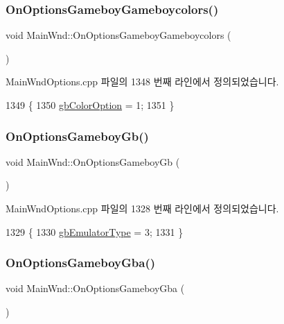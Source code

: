 \subsubsection{\texorpdfstring{On\+Options\+Gameboy\+Gameboycolors()}{OnOptionsGameboyGameboycolors()}}
{\footnotesize\ttfamily void Main\+Wnd\+::\+On\+Options\+Gameboy\+Gameboycolors (\begin{DoxyParamCaption}{ }\end{DoxyParamCaption})\hspace{0.3cm}{\ttfamily [protected]}}



Main\+Wnd\+Options.\+cpp 파일의 1348 번째 라인에서 정의되었습니다.


\begin{DoxyCode}
1349 \{
1350   \mbox{\hyperlink{gb_globals_8cpp_abb08650d8f653865820da10dc8e59a8b}{gbColorOption}} = 1;  
1351 \}
\end{DoxyCode}
\mbox{\label{class_main_wnd_a0b2a5caeea62067bd152c9247a52c3fa}} 
\subsubsection{\texorpdfstring{On\+Options\+Gameboy\+Gb()}{OnOptionsGameboyGb()}}
{\footnotesize\ttfamily void Main\+Wnd\+::\+On\+Options\+Gameboy\+Gb (\begin{DoxyParamCaption}{ }\end{DoxyParamCaption})\hspace{0.3cm}{\ttfamily [protected]}}



Main\+Wnd\+Options.\+cpp 파일의 1328 번째 라인에서 정의되었습니다.


\begin{DoxyCode}
1329 \{
1330   \mbox{\hyperlink{gb_globals_8cpp_aab449ed6ecf2bd502928a3d5aa5c54c4}{gbEmulatorType}} = 3;  
1331 \}
\end{DoxyCode}
\mbox{\label{class_main_wnd_abb13c622e7fb92ea067235276584d2ea}} 
\subsubsection{\texorpdfstring{On\+Options\+Gameboy\+Gba()}{OnOptionsGameboyGba()}}
{\footnotesize\ttfamily void Main\+Wnd\+::\+On\+Options\+Gameboy\+Gba (\begin{DoxyParamCaption}{ }\end{DoxyParamCaption})\hspace{0.3cm}{\ttfamily [protected]}}



